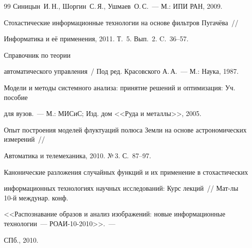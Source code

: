 {{\begin{thebibliography}{99}
Синицын~И.\,Н., Шоргин~С.\,Я., Ушмаев~О.\,С.~--- М.: ИПИ РАН, 2009.







 Стохастические информационные технологии на основе фильтров Пугачёва~/\!\!/ 


Информатика и её применения, 2011. Т.~5. Вып.~2. C.~36--57.







 Справочник по теории


автоматического управления~/ Под ред. Красовского А.\,А.~--- М.: Наука, 1987.












Модели и методы системного анализа: принятие решений и оптимизация: Уч. пособие


для вузов.~--- М.: МИСиС; Изд. дом <<Руда и металлы>>, 2005.









Опыт построения моделей флуктуаций полюса Земли на основе астрономических измерений~/\!\!/ 


Автоматика и телемеханика, 2010. №\,3. С.~87--97.









Канонические разложения случайных функций и их применение в стохастических 


информационных технологиях научных исследований: Курс лекций~/\!\!/ Мат-лы 10-й междунар. конф. 


<<Распознавание образов и анализ изображений: новые информационные технологии~--- РОАИ-10-2010>>.~--- 


СПб., 2010.










\end{thebibliography}}}
